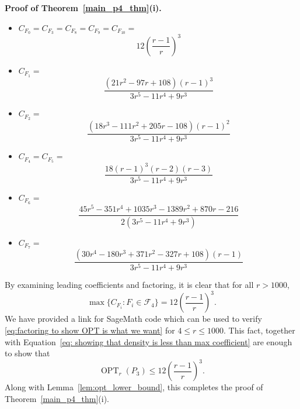\documentclass[12pt]{article}
\newtheorem{lemma}[thm]{Lemma}
\DeclareMathOperator{\OPT}{OPT}
\DeclareMathOperator{\Dist}{Dist}
\renewenvironment{proof}[1][Proof]{\textbf{#1.} }{\ \rule{0.5em}{0.5em}}
\begin{document}
\begin{proof}[Proof of Theorem~\ref{main_p4_thm}(i)]
\begin{itemize}
    \item $C_{F_0} = C_{F_3} = C_{F_8} = C_{F_9} = C_{F_{10}} = $ 
    \[ 
    12\left(\frac{r-1}{r}\right)^3
    \]
    \item $C_{F_1} =$
    \[
    \frac{(21r^2 - 97r + 108)(r - 1)^3}{3r^5 - 11r^4 + 9r^3}
    \]
    \item $C_{F_2} =$
    \[ \frac{(18r^3 - 111r^2 + 205r - 108)(r - 1)^2}{3r^5 - 11r^4 + 9r^3}
    \]
    \item $C_{F_4} = C_{F_5} = $
    \[ \frac{18(r - 1)^3(r - 2)(r - 3)}{3r^5 - 11r^4 + 9r^3}
    \]
    \item $C_{F_6} =$
    \[
    \frac{45r^5 - 351r^4 + 1035r^3 - 1389r^2 + 870r - 216}{2(3r^5 - 11r^4 + 9r^3)}
    \]
    \item $C_{F_7} =$
    \[ 
    \frac{(30r^4 - 180r^3 + 371r^2 - 327r + 108)(r - 1)}{3r^5 - 11r^4 + 9r^3}
    \]
\end{itemize}
By examining leading coefficients and factoring, it is clear that for all $r > 1000$,
\begin{equation}\label{eq:factoring to show OPT is what we want}
\max\{ C_{F_i} : F_i \in \mathcal{F}_4 \} = 12\left(\frac{r-1}{r}\right)^3.
\end{equation}
We have provided a link for SageMath code which can be used to verify \eqref{eq:factoring to show OPT is what we want} for $4 \leq r \leq 1000$. 
This fact, together with Equation~\ref{eq: showing that density is less than max coefficient} are enough to show that 
\[ \OPT_r(P_3) \leq 12\left(\frac{r-1}{r}\right)^3.\]
Along with Lemma~\ref{lem:opt_lower_bound}, this completes the proof of Theorem~\ref{main_p4_thm}(i). \end{proof}

\section{Stability}\label{sec:stability}
For two graphs $G$ and $H$ of the same order, the \emph{edit distance} between
$G$ and $H$, denoted $\Dist(G,H)$, is the minimum number of adjacencies
one needs to add or remove in order to change $G$ into a graph isomorphic to
$H$. Our goal in this section is to prove that graphs with $P_3$ density approaching
$\OPT_r(P_3)$ are close in structure to the Tur\'an graph $T_r(n)$.
Specifically, we prove the following lemma:

\begin{lemma}\label{lem:actual_stability}
For every $\varepsilon > 0$, there exists an $n_0$ and $\delta > 0$ such
that for every $K_{r+1}$-free graph $G$ of order $n \geq n_0$, if $d(P_3,G) \geq
\OPT_r(n) - \delta$, then $\Dist(G,T_r(n)) \leq \varepsilon n^2$. 
\end{lemma}
\end{document}
